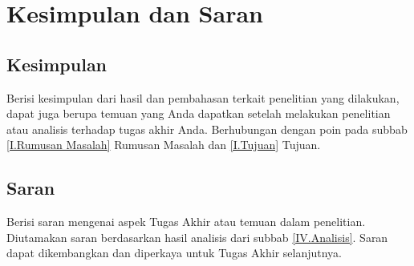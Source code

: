 \newpage
\chapter{Kesimpulan dan Saran} \label{Bab V}

\section{Kesimpulan} \label{V.Kesimpulan}
Berisi kesimpulan dari hasil dan pembahasan terkait penelitian yang dilakukan, dapat juga berupa temuan yang Anda dapatkan setelah melakukan penelitian atau analisis terhadap tugas akhir Anda. Berhubungan dengan poin pada subbab \ref{I.Rumusan Masalah} Rumusan Masalah dan \ref{I.Tujuan} Tujuan. 

\section{Saran} \label{V.Saran}
Berisi saran mengenai aspek Tugas Akhir atau temuan dalam penelitian. Diutamakan saran berdasarkan hasil analisis dari subbab \ref{IV.Analisis}. Saran dapat dikembangkan dan diperkaya untuk Tugas Akhir selanjutnya. 